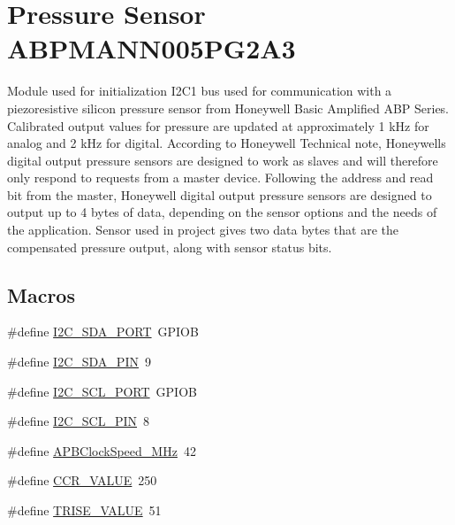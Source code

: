 \hypertarget{group___pressure_sensor_a_b_p_m_a_n_n005_p_g2_a3}{}\section{Pressure Sensor A\+B\+P\+M\+A\+N\+N005\+P\+G2\+A3}
\label{group___pressure_sensor_a_b_p_m_a_n_n005_p_g2_a3}


Module used for initialization I2\+C1 bus used for communication with a piezoresistive silicon pressure sensor from Honeywell Basic Amplified A\+BP Series. Calibrated output values for pressure are updated at approximately 1 k\+Hz for analog and 2 k\+Hz for digital. According to Honeywell Technical note, Honeywell\textquotesingle{}s digital output pressure sensors are designed to work as slaves and will therefore only respond to requests from a master device. Following the address and read bit from the master, Honeywell digital output pressure sensors are designed to output up to 4 bytes of data, depending on the sensor options and the needs of the application. Sensor used in project gives two data bytes that are the compensated pressure output, along with sensor status bits.  


\subsection*{Macros}
\begin{DoxyCompactItemize}
\item 
\#define \mbox{\hyperlink{group___pressure_sensor_a_b_p_m_a_n_n005_p_g2_a3_ga27ad1f279136628679479a5fedb6a94c_ga27ad1f279136628679479a5fedb6a94c}{I2\+C\+\_\+\+S\+D\+A\+\_\+\+P\+O\+RT}}~G\+P\+I\+OB
\item 
\#define \mbox{\hyperlink{group___pressure_sensor_a_b_p_m_a_n_n005_p_g2_a3_ga2cade698267beb86ccaa38c14d35ab0f_ga2cade698267beb86ccaa38c14d35ab0f}{I2\+C\+\_\+\+S\+D\+A\+\_\+\+P\+IN}}~9
\item 
\#define \mbox{\hyperlink{group___pressure_sensor_a_b_p_m_a_n_n005_p_g2_a3_ga3ef83d99ed25a619704947e5f77ca03d_ga3ef83d99ed25a619704947e5f77ca03d}{I2\+C\+\_\+\+S\+C\+L\+\_\+\+P\+O\+RT}}~G\+P\+I\+OB
\item 
\#define \mbox{\hyperlink{group___pressure_sensor_a_b_p_m_a_n_n005_p_g2_a3_ga0e4e08bab2fb484136d18b067bef372c_ga0e4e08bab2fb484136d18b067bef372c}{I2\+C\+\_\+\+S\+C\+L\+\_\+\+P\+IN}}~8
\item 
\#define \mbox{\hyperlink{group___pressure_sensor_a_b_p_m_a_n_n005_p_g2_a3_gaab67b9610994e1990a3b56590a129775_gaab67b9610994e1990a3b56590a129775}{A\+P\+B\+Clock\+Speed\+\_\+\+M\+Hz}}~42
\item 
\#define \mbox{\hyperlink{group___pressure_sensor_a_b_p_m_a_n_n005_p_g2_a3_ga7026c87335ace84ae881f34303b29aff_ga7026c87335ace84ae881f34303b29aff}{C\+C\+R\+\_\+\+V\+A\+L\+UE}}~250
\item 
\#define \mbox{\hyperlink{group___pressure_sensor_a_b_p_m_a_n_n005_p_g2_a3_gab1dc00ef716bb1ba8effeb4bd7a86c44_gab1dc00ef716bb1ba8effeb4bd7a86c44}{T\+R\+I\+S\+E\+\_\+\+V\+A\+L\+UE}}~51
\end{DoxyCompactItemize}
